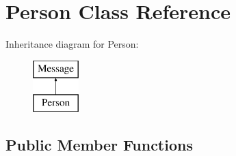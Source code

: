 \hypertarget{class_person}{}\section{Person Class Reference}
\label{class_person}
Inheritance diagram for Person\+:\begin{figure}[H]
\begin{center}
\leavevmode
\includegraphics[height=2.000000cm]{class_person}
\end{center}
\end{figure}
\subsection*{Public Member Functions}
